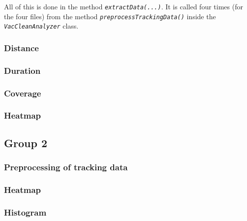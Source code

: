\documentclass[twoside]{article}
\begin{document}
All of this is done in the method \textit{\texttt{extractData(...)}}. It is called four times (for the four files) from the method \textit{\texttt{preprocessTrackingData()}} inside the \textit{\texttt{VacCleanAnalyzer}} class.

\subsubsection{Distance} %
\subsubsection{Duration} %
\subsubsection{Coverage} %
\subsubsection{Heatmap} %

\subsection{Group 2} %
\subsubsection{Preprocessing of tracking data}
\subsubsection{Heatmap}
\subsubsection{Histogram}

\end{document}
